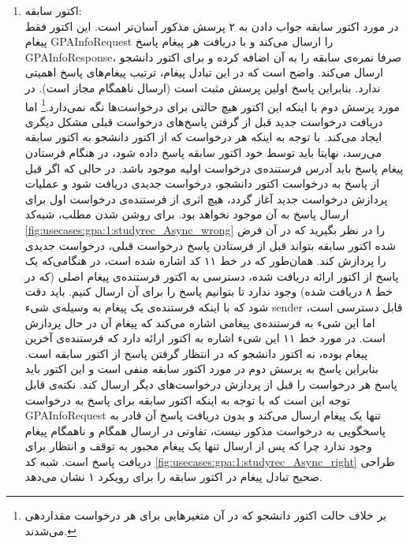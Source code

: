 \begin{enumerate}

 \FloatBarrier
\item اکتور سابقه:\\
در مورد اکتور سابقه جواب دادن به ۲ پرسش مذکور آسان‌تر است. این اکتور فقط پیغام GPAInfoRequest را ارسال می‌کند و با دریافت هر پیغام پاسخ GPAInfoResponse، صرفا نمره‌ی سابقه را به آن اضافه کرده و برای اکتور دانشجو ارسال می‌کند. واضح است که در این تبادل پیغام، ترتیب پیغام‌‌های پاسخ اهمیتی ندارد. بنابراین پاسخ اولین پرسش مثبت است (ارسال ناهمگام مجاز است). در مورد پرسش دوم با اینکه این اکتور هیچ حالتی برای درخواست‌ها نگه نمی‌دارد.\footnote{بر خلاف حالت اکتور دانشجو که در آن متغیر‌هایی برای هر درخواست مقداردهی می‌شدند.} اما دریافت درخواست جدید قبل از گرفتن پاسخ‌های درخواست قبلی  مشکل دیگری ایجاد می‌کند. با توجه به اینکه  هر درخواست که از اکتور دانشجو به اکتور سابقه می‌رسد، نهایتا باید توسط خود اکتور سابقه پاسخ داده شود، در هنگام فرستادن پیغام پاسخ باید آدرس فرستنده‌ی درخواست اولیه موجود باشد. در حالی که اگر قبل از پاسخ به درخواست اکتور دانشجو، درخواست جدیدی دریافت شود و عملیات پردازش درخواست جدید آغاز گردد، هیچ اثری از فرستنده‌ی 
درخواست اول برای ارسال پاسخ به آن موجود نخواهد بود. برای روشن شدن مطلب، شبه‌کد  \ref{fig:usecases:gpa:1:studyrec_Async_wrong} را در نظر بگیرید که در آن فرض شده اکتور سابقه بتواند قبل از فرستادن پاسخ درخواست قبلی، درخواست جدیدی را پردازش کند. همان‌طور که در خط ۱۱ کد اشاره شده است، در هنگامی‌که یک پاسخ از اکتور ارائه دریافت شده، دسترسی به اکتور فرستنده‌ی پیغام اصلی (که در خط ۸ دریافت شده) وجود ندارد تا بتوانیم پاسخ را برای آن ارسال کنیم. باید دقت شود که با اینکه فرستنده‌ی یک پیغام به وسیله‌ی شیء sender قابل دسترسی است، اما این شیء به فرستنده‌ی پیغامی اشاره می‌کند که پیغام آن در حال پردازش است. در مورد خط ۱۱ این شیء اشاره به اکتور ارائه دارد که فرستنده‌ی آخرین پیغام بوده، نه اکتور دانشجو که در انتظار گرفتن پاسخ از اکتور سابقه است. بنابراین پاسخ به پرسش دوم در مورد اکتور سابقه منفی است و این اکتور باید پاسخ هر درخواست را قبل از  پردازش درخواست‌های دیگر ارسال کند. نکته‌ی قابل توجه این است که با توجه به اینکه اکتور سابقه برای پاسخ به درخواست GPAInfoRequest تنها یک پیغام ارسال می‌کند و بدون دریافت پاسخ آن قادر به پاسخگویی به درخواست مذکور نیست، تفاوتی در ارسال همگام و ناهمگام پیغام وجود ندارد چرا که پس از ارسال تنها یک پیغام مجبور به توقف و انتظار برای دریافت پاسخ است. شبه کد \ref{fig:usecases:gpa:1:studyrec_Async_right} طراحی صحیح تبادل پیغام در اکتور سابقه را برای رویکرد ۱ نشان می‌دهد.


\end{enumerate}
